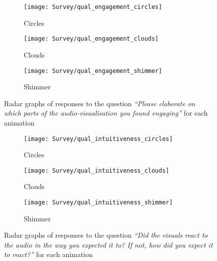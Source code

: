 \documentclass[../initial_thesis.tex]{subfiles}
\begin{document}
\begin{figure}
  \begin{subfigure}{0.5\textwidth}
    \centering
    \texttt{[image: Survey/qual\_engagement\_circles]}
    \caption{Circles}
    \label{fig:engagement_circles}
  \end{subfigure}
  \begin{subfigure}{0.5\textwidth}
    \centering
    \texttt{[image: Survey/qual\_engagement\_clouds]}
    \caption{Clouds}
    \label{fig:engagement_clouds}
  \end{subfigure}
  \begin{subfigure}{0.5\textwidth}
    \centering
    \texttt{[image: Survey/qual\_engagement\_shimmer]}
    \caption{Shimmer}
    \label{fig:engagement_shimmer}
  \end{subfigure}
  \caption{Radar graphs of responses to the question \textit{``Please elaborate on which parts of the audio-visualisation you found engaging''} for each animation}
  \label{fig:engagement_radar}
\end{figure}

\begin{figure}
  \begin{subfigure}{0.5\textwidth}
    \centering
    \texttt{[image: Survey/qual\_intuitiveness\_circles]}
    \caption{Circles}
    \label{fig:intuitiveness_circles}
  \end{subfigure}
  \begin{subfigure}{0.5\textwidth}
    \centering
    \texttt{[image: Survey/qual\_intuitiveness\_clouds]}
    \caption{Clouds}
    \label{fig:intuitiveness_clouds}
  \end{subfigure}
  \begin{subfigure}{0.5\textwidth}
    \centering
    \texttt{[image: Survey/qual\_intuitiveness\_shimmer]}
    \caption{Shimmer}
    \label{fig:intuitiveness_shimmer}
  \end{subfigure}
  \caption{Radar graphs of responses to the question \textit{``Did the visuals react to the audio in the way you expected it to? If not, how did you expect it to react?''} for each animation}
  \label{fig:intuitiveness_radar}
\end{figure}
\end{document}
